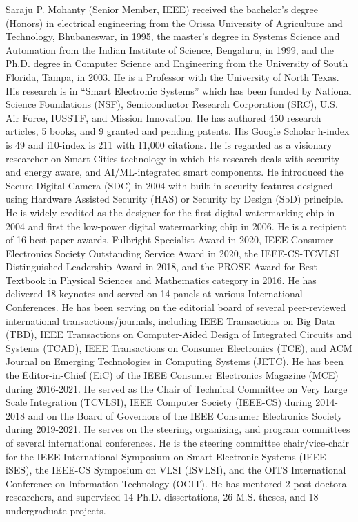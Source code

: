 \documentclass[journal,12pt,onecolumn,letterpaper]{IEEEtran}
\begin{document}
\begin{IEEEbiography}
{Saraju P. Mohanty} (Senior Member, IEEE) received the bachelor's degree (Honors) in electrical engineering from the Orissa University of Agriculture and Technology, Bhubaneswar, in 1995, the master's degree in Systems Science and Automation from the Indian Institute of Science, Bengaluru, in 1999, and the Ph.D. degree in Computer Science and Engineering from the University of South Florida, Tampa, in 2003. He is a Professor with the University of North Texas. His research is in ``Smart Electronic Systems'' which has been funded by National Science Foundations (NSF), Semiconductor Research Corporation (SRC), U.S. Air Force, IUSSTF, and Mission Innovation. He has authored 450 research articles, 5 books, and 9 granted and pending patents. His Google Scholar h-index is 49 and i10-index is 211 with 11,000 citations. He is regarded as a visionary researcher on Smart Cities technology in which his research deals with security and energy aware, and AI/ML-integrated smart components. He introduced the Secure Digital Camera (SDC) in 2004 with built-in security features designed using Hardware Assisted Security (HAS) or Security by Design (SbD) principle. He is widely credited as the designer for the first digital watermarking chip in 2004 and first the low-power digital watermarking chip in 2006. He is a recipient of 16 best paper awards, Fulbright Specialist Award in 2020, IEEE Consumer Electronics Society Outstanding Service Award in 2020, the IEEE-CS-TCVLSI Distinguished Leadership Award in 2018, and the PROSE Award for Best Textbook in Physical Sciences and Mathematics category in 2016. He has delivered 18 keynotes and served on 14 panels at various International Conferences. He has been serving on the editorial board of several peer-reviewed international transactions/journals, including IEEE Transactions on Big Data (TBD), IEEE Transactions on Computer-Aided Design of Integrated Circuits and Systems (TCAD), IEEE Transactions on Consumer Electronics (TCE), and ACM Journal on Emerging Technologies in Computing Systems (JETC). He has been the Editor-in-Chief (EiC) of the IEEE Consumer Electronics Magazine (MCE) during 2016-2021. He served as the Chair of Technical Committee on Very Large Scale Integration (TCVLSI), IEEE Computer Society (IEEE-CS) during 2014-2018 and on the Board of Governors of the IEEE Consumer Electronics Society during 2019-2021. He serves on the steering, organizing, and program committees of several international conferences. He is the steering committee chair/vice-chair for the IEEE International Symposium on Smart Electronic Systems (IEEE-iSES), the IEEE-CS Symposium on VLSI (ISVLSI), and the OITS International Conference on Information Technology (OCIT). He has mentored 2 post-doctoral researchers, and supervised 14 Ph.D. dissertations, 26 M.S. theses, and 18 undergraduate projects.
\end{IEEEbiography}
\end{document}
